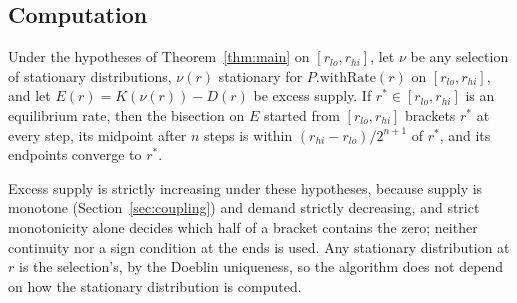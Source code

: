 \subsection{Computation}

\begin{theorem}\label{thm:bisect}
Under the hypotheses of Theorem~\ref{thm:main} on $[r_{lo},r_{hi}]$, let $\nu$ be any selection of
stationary distributions, $\nu(r)$ stationary for $P.\text{withRate}(r)$ on $[r_{lo},r_{hi}]$,
and let $E(r)=K(\nu(r))-D(r)$ be excess supply. If $r^*\in[r_{lo},r_{hi}]$ is an equilibrium rate,
then the bisection on $E$ started from $[r_{lo},r_{hi}]$ brackets $r^*$ at every step, its
midpoint after $n$ steps is within $(r_{hi}-r_{lo})/2^{n+1}$ of $r^*$, and its endpoints converge
to $r^*$.
\end{theorem}

Excess supply is strictly increasing under these hypotheses, because supply is monotone
(Section~\ref{sec:coupling}) and demand strictly decreasing, and strict monotonicity alone decides
which half of a bracket contains the zero; neither continuity nor a sign condition at the ends is
used. Any stationary distribution at $r$ is the selection's, by the Doeblin uniqueness, so the
algorithm does not depend on how the stationary distribution is computed.

